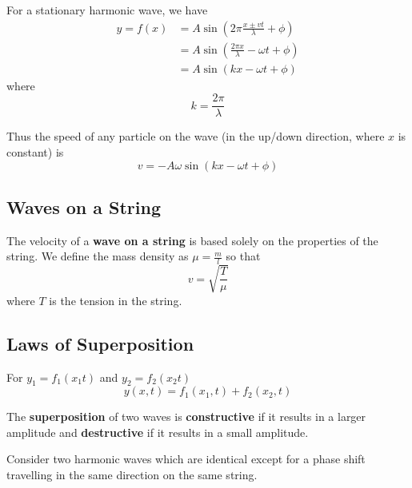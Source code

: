 \documentclass[12pt]{article}
\begin{document}
For a stationary harmonic wave, we have
\begin{align*}
y = f(x) &= A\sin(2\pi\frac{x\pm vt}{\lambda}+\phi)\\
&= A\sin(\frac{2\pi x}{\lambda} - \omega t + \phi)\\
&= A\sin(kx - \omega t + \phi)
\end{align*}
where \[ k = \frac{2\pi}{\lambda} \]

Thus the speed of any particle on the wave (in the up/down direction, where $x$ is constant) is \[ v = -A\omega\sin(kx - \omega t + \phi) \]

\subsection*{Waves on a String}
The velocity of a {\bf wave on a string} is based solely on the properties of the string. We define the mass density as $\mu = \frac{m}{l}$ so that \[ v = \sqrt{\frac{T}{\mu}} \] where $T$ is the tension in the string.

\subsection*{Laws of Superposition}
For $y_1 = f_1(x_1t)$ and $y_2 = f_2(x_2t)$ \[ y(x,t) = f_1(x_1,t) + f_2(x_2,t) \]

The {\bf superposition} of two waves is {\bf constructive} if it results in a larger amplitude and {\bf destructive} if it results in a small amplitude.

Consider two harmonic waves which are identical except for a phase shift travelling in the same direction on the same string.
\end{document}
